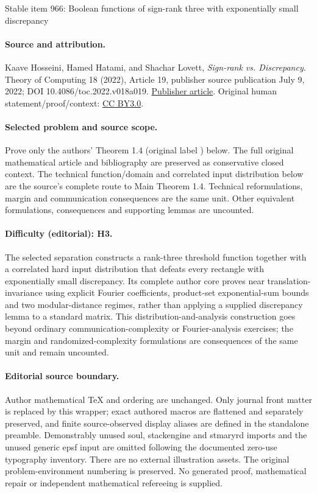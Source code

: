 \documentclass[11pt]{article}
\numberwithin{equation}{section}
\theoremstyle{definition}
\theoremstyle{plain}
\theoremstyle{definition}\newtheorem{problem}[theorem]{Problem}\theoremstyle{plain}
\begin{document}
\begin{center}{\Large Stable item 966: Boolean functions of sign-rank three with exponentially small discrepancy}\end{center}
\paragraph{Source and attribution.}
Kaave Hosseini, Hamed Hatami, and Shachar Lovett, \emph{Sign-rank vs. Discrepancy}. Theory of Computing 18 (2022), Article 19, publisher source publication July 9, 2022; DOI 10.4086/toc.2022.v018a019. \href{https://theoryofcomputing.org/articles/v018a019/}{Publisher article}. Original human statement/proof/context: \href{https://creativecommons.org/licenses/by/3.0/}{CC BY3.0}.
\paragraph{Selected problem and source scope.}
Prove only the authors' Theorem 1.4 (original label ) below. The full original mathematical article and bibliography are preserved as conservative closed context. The technical function/domain and correlated input distribution below are the source's complete route to Main Theorem 1.4. Technical reformulations, margin and communication consequences are the same unit. Other equivalent formulations, consequences and supporting lemmas are uncounted.
\paragraph{Difficulty (editorial): H3.}
The selected separation constructs a rank-three threshold function together with a correlated hard input distribution that defeats every rectangle with exponentially small discrepancy. Its complete author core proves near translation-invariance using explicit Fourier coefficients, product-set exponential-sum bounds and two modular-distance regimes, rather than applying a supplied discrepancy lemma to a standard matrix. This distribution-and-analysis construction goes beyond ordinary communication-complexity or Fourier-analysis exercises; the margin and randomized-complexity formulations are consequences of the same unit and remain uncounted.
\paragraph{Editorial source boundary.}
Author mathematical TeX and ordering are unchanged. Only journal front matter is replaced by this wrapper; exact authored macros are flattened and separately preserved, and finite source-observed display aliases are defined in the standalone preamble. Demonstrably unused soul, stackengine and stmaryrd imports and the unused generic epsf input are omitted following the documented zero-use typography inventory. There are no external illustration assets. The original problem-environment numbering is preserved. No generated proof, mathematical repair or independent mathematical refereeing is supplied. 
\clearpage
\end{document}
